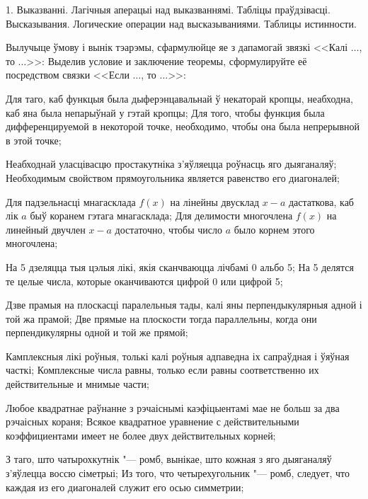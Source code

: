 



\biLangHeader
{1. Выказванні. Лагічныя аперацыі над выказваннямі. Табліцы праўдзівасці.}
{Высказывания. Логические операции над высказываниями. Таблицы истинности.}

\begin{problemList}

\problemItemSimple
{Вылучыце ўмову і вынік тэарэмы, сфармулюйце яе з дапамогай звязкі <<Калі $\ldots$, то $\ldots$>>:}
{Выделив условие и заключение теоремы, сформулируйте её посредством связки <<Если $\ldots$, то $\ldots$>>:}

\begin{belarusianEnumerate}

\problemItemSimple
{Для таго, каб функцыя была дыферэнцавальнай ў некаторай кропцы, неабходна, каб яна была непарыўнай у гэтай кропцы;}
{Для того, чтобы функция была дифференцируемой в некоторой точке, необходимо, чтобы она была непрерывной в этой точке;}

\problemItemSimple
{Неабходнай уласцівасцю простакутніка з'яўляецца роўнасць яго дыяганаляў;}
{Необходимым свойством прямоугольника является равенство его диагоналей;}

\problemItemSimple
{Для падзельнасці мнагасклада $f(x)$ на лінейны двусклад $x - a$ дастаткова, каб лік $a$ быў коранем гэтага мнагасклада;}
{Для делимости многочлена $f(x)$ на линейный двучлен $x - a$ достаточно, чтобы число $a$ было корнем этого многочлена;}

\problemItemSimple
{На 5 дзеляцца тыя цэлыя лікі, якія сканчваюцца лічбамі 0 альбо 5;}
{На 5 делятся те целые числа, которые оканчиваются цифрой 0 или цифрой 5;}

\problemItemSimple
{Дзве прамыя на плоскасці паралельныя тады, калі яны перпендыкулярныя адной і той жа прамой;}
{Две прямые на плоскости тогда параллельны, когда они перпендикулярны одной и той же прямой;}

\problemItemSimple
{Камплексныя лікі роўныя, толькі калі роўныя адпаведна іх сапраўдная і ўяўная часткі;}
{Комплексные числа равны, только если равны соответственно их действительные и мнимые части;}

\problemItemSimple
{Любое квадратнае раўнанне з рэчаіснымі каэфіцыентамі мае не больш за два рэчаісных кораня;}
{Всякое квадратное уравнение с действительными коэффициентами имеет не более двух действительных корней;}

\problemItemSimple
{З таго, што чатырохкутнік "--- ромб, вынікае, што кожная з яго дыяганаляў з'яўлецца воссю сіметрыі;}
{Из того, что четырехугольник "--- ромб, следует, что каждая из его диагоналей служит его осью симметрии;}


\end{belarusianEnumerate}
\end{problemList}
